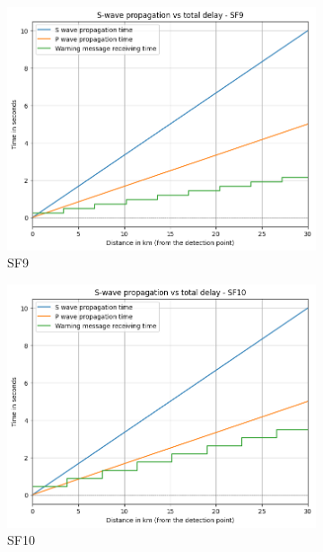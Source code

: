 \begin{figure}[htp!]
\begin{subfigure}{0.45\linewidth}
        \includegraphics[width=\linewidth]{images/sf-09-30km.png}
        \caption{SF9}
    \end{subfigure}
   \hfill
    \begin{subfigure}{0.45\linewidth}
        \includegraphics[width=\linewidth]{images/sf-10-30km.png}
        \caption{SF10}
    \end{subfigure}
    \\
    \begin{subfigure}{0.45\linewidth}

\end{subfigure}
\end{figure}
